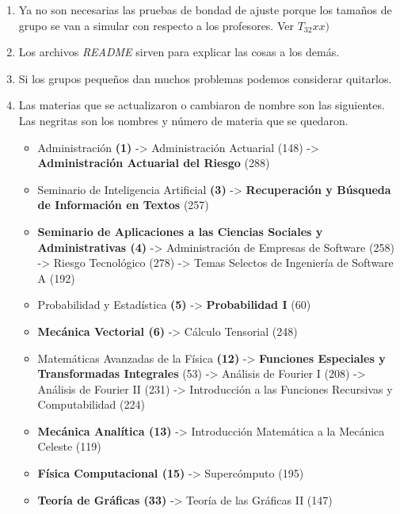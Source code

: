 \begin{appendices}
\begin{enumerate}
  \item Ya no son necesarias las pruebas de bondad de ajuste porque los tamaños de grupo se van a simular con respecto a los profesores. Ver $T_{32} xx)$
  
  \item Los archivos \textit{README} sirven para explicar las cosas a los demás.
  
  \item Si los grupos pequeños dan muchos problemas podemos considerar quitarlos.
  
  \item Las materias que se actualizaron o cambiaron de nombre son las siguientes. Las negritas son los nombres y número de materia que se quedaron.
  \begin{itemize}
  \item Administración \textbf{(1)} -> Administración Actuarial (148) -> \textbf{Administración Actuarial del Riesgo} (288)
  
  \item Seminario de Inteligencia Artificial \textbf{(3)} -> \textbf{Recuperación y Búsqueda de Información en Textos} (257)
  
  \item \textbf{Seminario de Aplicaciones a las Ciencias Sociales y Administrativas (4)} -> Administración de Empresas de Software (258) -> Riesgo Tecnológico (278) -> Temas Selectos de Ingeniería de Software A (192)
  
  \item Probabilidad y Estadística \textbf{(5)} -> \textbf{Probabilidad I} (60)

\item \textbf{Mecánica Vectorial (6)} -> Cálculo Tensorial (248)

  
  \item Matemáticas Avanzadas de la Física \textbf{(12)} -> \textbf{Funciones Especiales y Transformadas Integrales} (53) -> Análisis de Fourier I (208) -> Análisis de Fourier II (231) -> Introducción a las Funciones Recursivas y Computabilidad (224)

  \item \textbf{Mecánica Analítica (13)} -> Introducción Matemática a la Mecánica Celeste (119)

  \item \textbf{Física Computacional (15)} -> Supercómputo (195)

  \item \textbf{Teoría de Gráficas (33)} -> Teoría de las Gráficas II (147)
  

\end{itemize}
\end{enumerate}
\end{appendices}
